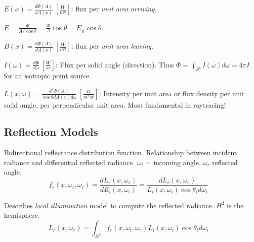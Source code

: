 \begin{definition}[Irradiance]
  \(E(x) = \frac{d \Phi(A)}{d A(x)} \ \left[\frac{W}{m^2}\right]\):
  flux per \textit{unit area arriving}.
\end{definition}

\begin{algorithm}
  \(E =\frac{\Phi}{A / \cos \theta} = \frac{\Phi}{A} \cos \theta = E_{\vec{n}} \cos \theta\).
\end{algorithm}

\begin{definition}[Radiosity]
  \(B(x) = \frac{d\Phi(A)}{dA(x)} \ \left[\frac{W}{m^2}\right]\):
  flux per \textit{unit area leaving}.
\end{definition}

\begin{definition}[Intensity]
  \(I(\omega) = \frac{d\Phi}{d\omega} \ \left[\frac{W}{sr}\right]\):
  Flux per solid angle (direction). Thus \(\Phi = \int_{S^2} I(\omega) d\omega = 4 \pi I\) for an isotropic point source.
\end{definition}

\begin{definition}[Radiance]
  \(L(x, \omega) = \frac{d^2 \Phi(A)}{\cos \theta dA(x) d\omega} \ \left[\frac{W}{m^2sr}\right]\):
  Intensity per unit area or flux density per unit solid angle, per perpendicular unit area. Most fundamental in raytracing!
\end{definition}

\subsection{Reflection Models}
\begin{definition}[BRDF]
  Bidirectional reflectance distribution function. Relationship between incident radiance and differential reflected radiance. \(\omega_i\) = incoming angle, \(\omega_r\) reflected angle.
  \[f_r(x, \omega_i, \omega_r) = \frac{dL_r(x, \omega_r)}{dE_i(x, \omega_i)} = \frac{dL_r(x, \omega_r)}{L_i(x, \omega_i) \cos \theta_i d\omega_i}\]
\end{definition}

\begin{definition}
  Describes \textit{local illumination} model to compute the reflected radiance. \(H^2\) is the hemisphere.
  \[L_r(x, \omega_r) = \int_{H^2}f_r(x, \omega_i, \omega_r)L_i(x, \omega_i) \cos \theta_i d \omega_i\]
\end{definition}

